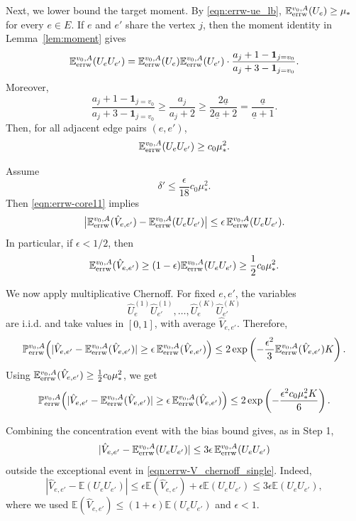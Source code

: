 \documentclass[a4paper, 11pt]{article}
\renewcommand{\P}{\mathbb{P}}
\newcommand{\E}{\mathbb{E}}
\newcommand{\Eerrw}{\E_{\textnormal{errw}}}
\newcommand{\Perrw}{\P_{\textnormal{errw}}}
\newcommand{\ind}{\mathbf{1}}
\begin{document}
Next, we lower bound the target moment. 
By \cref{eqn:errw-ue_lb}, \(\Eerrw^{v_0,A}(U_e)\ge\mu_*\) for every \(e\in E\). If \(e\) and \(e'\) share the vertex \(j\), then the moment identity in Lemma~\ref{lem:moment} gives
\[
\Eerrw^{v_0,A}(U_eU_{e'})
=
\Eerrw^{v_0,A}(U_e)\Eerrw^{v_0,A}(U_{e'})
\cdot
\frac{a_j+1-\ind_{j=v_0}}{a_j+3-\ind_{j=v_0}}.
\]
Moreover,
\[
\frac{a_j+1-\ind_{j=v_0}}{a_j+3-\ind_{j=v_0}}
\ge
\frac{a_j}{a_j+2}
\ge
\frac{2\underline a}{2\underline a+2}
=
\frac{\underline a}{\underline a+1}.
\]
Then, for all adjacent edge pairs \((e,e')\),
\begin{equation}
\label{eqn:errw-ue2_lb}
\Eerrw^{v_0,A}(U_eU_{e'})
\ge
c_0\mu_*^2.
\end{equation}

Assume
\begin{equation}
\label{eqn:errw-deltaprimeconditionV}
\delta'\le \frac{\epsilon}{18}c_0\mu_*^2.
\end{equation}
Then \cref{eqn:errw-core11} implies
\[
\big|\Eerrw^{v_0,A}(\hat V_{e,e'})
-\Eerrw^{v_0,A}(U_eU_{e'})\big|
\le
\epsilon\,\Eerrw^{v_0,A}(U_eU_{e'}).
\]
In particular, if \(\epsilon<1/2\), then
\[
\Eerrw^{v_0,A}(\hat V_{e,e'})
\ge
(1-\epsilon)\Eerrw^{v_0,A}(U_eU_{e'})
\ge
\frac12 c_0\mu_*^2.
\]

We now apply multiplicative Chernoff. For fixed \(e,e'\), the variables
\[
\hat U_e^{(1)}\hat U_{e'}^{(1)},\ldots,
\hat U_e^{(K)}\hat U_{e'}^{(K)}
\]
are i.i.d. and take values in \([0,1]\), with average \(\hat V_{e,e'}\). Therefore,
\[
\Perrw^{v_0,A}\Big(
|\hat V_{e,e'}-\Eerrw^{v_0,A}(\hat V_{e,e'})|
\ge
\epsilon\,\Eerrw^{v_0,A}(\hat V_{e,e'})
\Big)
\le
2\exp\left(
-\frac{\epsilon^2}{3}\Eerrw^{v_0,A}(\hat V_{e,e'})K
\right).
\]
Using \(\Eerrw^{v_0,A}(\hat V_{e,e'})\ge \frac12c_0\mu_*^2\), we get
\begin{equation}
\label{eqn:errw-V_chernoff_single}
\Perrw^{v_0,A}\Big(
|\hat V_{e,e'}-\Eerrw^{v_0,A}(\hat V_{e,e'})|
\ge
\epsilon\,\Eerrw^{v_0,A}(\hat V_{e,e'})
\Big)
\le
2\exp\left(
-\frac{\epsilon^2c_0\mu_*^2K}{6}
\right).
\end{equation}

Combining the concentration event with the bias bound gives, as in Step 1,
\[
|\hat V_{e,e'}-\Eerrw^{v_0,A}(U_eU_{e'})|
\le
3\epsilon\,\Eerrw^{v_0,A}(U_eU_{e'})
\]
outside the exceptional event in \cref{eqn:errw-V_chernoff_single}. Indeed,
\[
|\hat V_{e,e'}-\E(U_eU_{e'})|
\le
\epsilon\E(\hat V_{e,e'})
+\epsilon\E(U_eU_{e'})
\le
3\epsilon\E(U_eU_{e'}),
\]
where we used \(\E(\hat V_{e,e'})\le(1+\epsilon)\E(U_eU_{e'})\) and \(\epsilon<1\).
\end{document}
